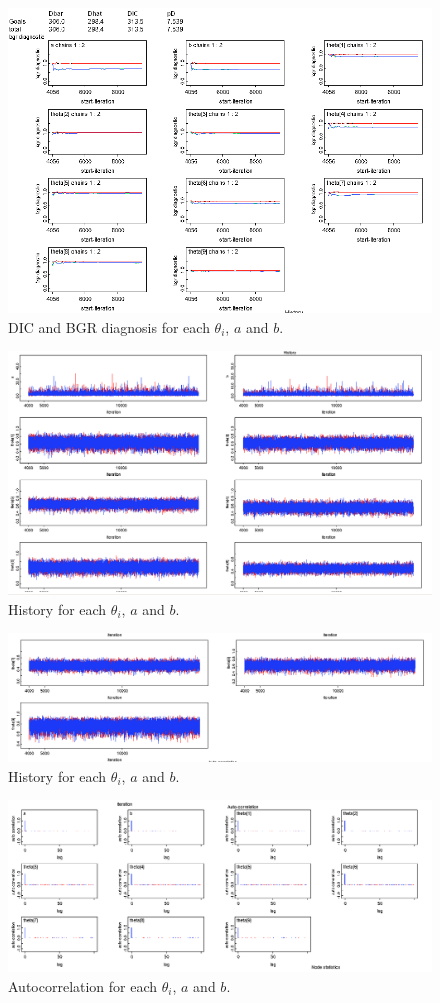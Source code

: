 \documentclass{article}
\begin{document}
  \begin{figure}[ht!]
  \centering
  \includegraphics[width=.8\textwidth]{imgs/M3b_1.png}
  \caption{DIC and BGR diagnosis for each $\theta_i$, $a$ and $b$.}
  \label{fig:fig12}
  \end{figure}
  \begin{figure}[ht!]
  \centering
  \includegraphics[width=.8\textwidth]{imgs/M3b_2.png}
  \caption{History for each $\theta_i$, $a$ and $b$.}
  \label{fig:fig13}
  \end{figure}
  \begin{figure}[ht!]
  \centering
  \includegraphics[width=.8\textwidth]{imgs/M3b_3.png}
  \caption{History for each $\theta_i$, $a$ and $b$.}
  \label{fig:fig14}
  \end{figure}
  \begin{figure}[ht!]
  \centering
  \includegraphics[width=1\textwidth]{imgs/M3b_4.png}
  \caption{Autocorrelation for each $\theta_i$, $a$ and $b$.}
  \label{fig:fig15}
  \end{figure}
\end{document}

